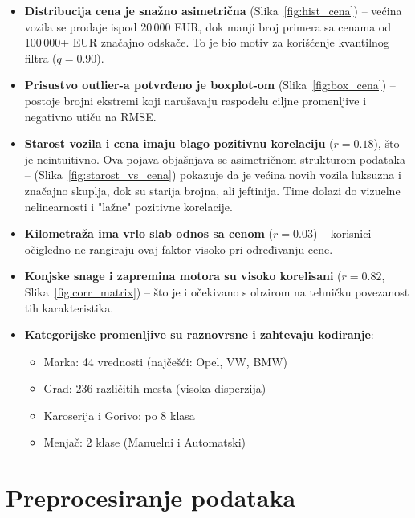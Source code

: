 \documentclass[a4paper,12pt]{article}
\begin{document}
\begin{itemize}
    \item \textbf{Distribucija cena je snažno asimetrična} (Slika~\ref{fig:hist_cena}) – većina vozila se prodaje ispod 20\,000 EUR, dok manji broj primera sa cenama od 100\,000+ EUR značajno odskače. To je bio motiv za korišćenje kvantilnog filtra ($q=0.90$).
    
    \item \textbf{Prisustvo outlier-a potvrđeno je boxplot-om} (Slika~\ref{fig:box_cena}) – postoje brojni ekstremi koji narušavaju raspodelu ciljne promenljive i negativno utiču na RMSE.

    \item \textbf{Starost vozila i cena imaju blago pozitivnu korelaciju} ($r = 0.18$), što je neintuitivno. Ova pojava objašnjava se asimetričnom strukturom podataka – (Slika~\ref{fig:starost_vs_cena}) pokazuje da je većina novih vozila luksuzna i značajno skuplja, dok su starija brojna, ali jeftinija. Time dolazi do vizuelne nelinearnosti i "lažne" pozitivne korelacije.

    \item \textbf{Kilometraža ima vrlo slab odnos sa cenom} ($r = 0.03$) – korisnici očigledno ne rangiraju ovaj faktor visoko pri određivanju cene.

    \item \textbf{Konjske snage i zapremina motora su visoko korelisani} ($r = 0.82$, Slika~\ref{fig:corr_matrix}) – što je i očekivano s obzirom na tehničku povezanost tih karakteristika.

    \item \textbf{Kategorijske promenljive su raznovrsne i zahtevaju kodiranje}:
    \begin{itemize}
        \item Marka: 44 vrednosti (najčešći: Opel, VW, BMW)
        \item Grad: 236 različitih mesta (visoka disperzija)
        \item Karoserija i Gorivo: po 8 klasa
        \item Menjač: 2 klase (Manuelni i Automatski)
    \end{itemize}
\end{itemize}

\section{Preprocesiranje podataka}
\end{document}
